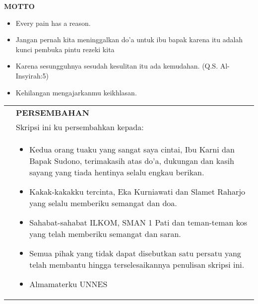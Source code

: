 \acknowledgment
 \noindent  \MakeUppercase{\normalfont\bfseries MOTTO}
\noindent  \begin{itemize}[leftmargin=*,noitemsep,topsep=0pt]
	\item Every pain has a reason.
	\item Jangan pernah kita meninggalkan do’a untuk ibu bapak karena itu adalah kunci pembuka pintu rezeki kita
	\item Karena sesungguhnya sesudah kesulitan itu ada kemudahan. (Q.S. Al-Insyirah:5)
	\item Kehilangan mengajarkanmu keikhlasan.
\end{itemize}

\vspace{1.5cm}
\noindent  \begin{tabular}{p{2.5cm} p{10.5cm}}
& \MakeUppercase{\normalfont\bfseries PERSEMBAHAN} \\
& Skripsi ini ku persembahkan kepada: \\
& \vspace*{-\baselineskip} \noindent  \begin{itemize}[leftmargin=*, noitemsep,topsep=0pt]   
	\item Kedua orang tuaku yang sangat saya cintai, Ibu Karni dan Bapak Sudono, terimakasih atas do’a, dukungan dan kasih sayang yang tiada hentinya selalu engkau berikan.
	\item Kakak-kakakku tercinta, Eka Kurniawati dan Slamet Raharjo yang selalu memberiku semangat dan doa.
	\item Sahabat-sahabat ILKOM, SMAN 1 Pati dan teman-teman kos yang telah memberiku semangat dan saran.
	\item Semua pihak yang tidak dapat disebutkan satu persatu yang telah membantu hingga terselesaikannya penulisan skripsi ini.
	\item Almamaterku UNNES 
	\end{itemize}	\\
\end{tabular}